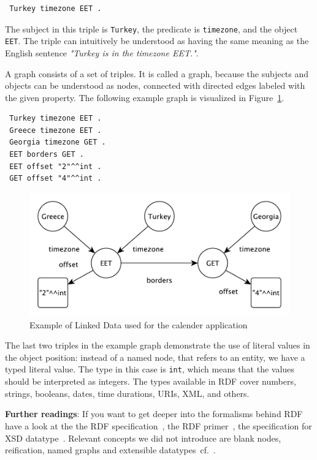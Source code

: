 \begin{verbatim}
 Turkey timezone EET .
\end{verbatim}

The subject in this triple is \texttt{Turkey}, the predicate is \texttt{timezone}, and the object \texttt{EET}.
The triple can intuitively be understood as having the same meaning as the English sentence \textit{"Turkey is in the timezone EET."}.

A graph consists of a set of triples.
It is called a graph, because the subjects and objects can be understood as nodes, connected with directed edges labeled with the given property.
The following example graph is visualized in Figure~\ref{fig:graph}.
\begin{verbatim}
 Turkey timezone EET .
 Greece timezone EET .
 Georgia timezone GET .
 EET borders GET .
 EET offset "2"^^int .
 GET offset "4"^^int . 
\end{verbatim}

\begin{figure}
\includegraphics[width=\linewidth]{part_01/fig_graph.pdf}
\caption{Example of Linked Data used for the calender application}
\label{fig:graph}
\end{figure}

The last two triples in the example graph demonstrate the use of literal values in the object position: instead of a named node, that refers to an entity, we have a typed literal value.
The type in this case is \texttt{int}, which means that the values should be interpreted as integers.
The types available in RDF cover numbers, strings, booleans, dates, time durations, URIs, XML, and others.

\medskip

\textbf{Further readings}:
If you want to get deeper into the formalisms behind RDF have a look at the the RDF specification~\cite{rdf-spec}, 
the RDF primer~\cite{rdfprimer}, 
the specification for XSD datatype~\cite{xsd-part2}.
Relevant concepts we did not introduce are blank nodes, reification, named graphs and extensible datatypes~cf.~\cite{namedgraphs,rdfprimer}.

